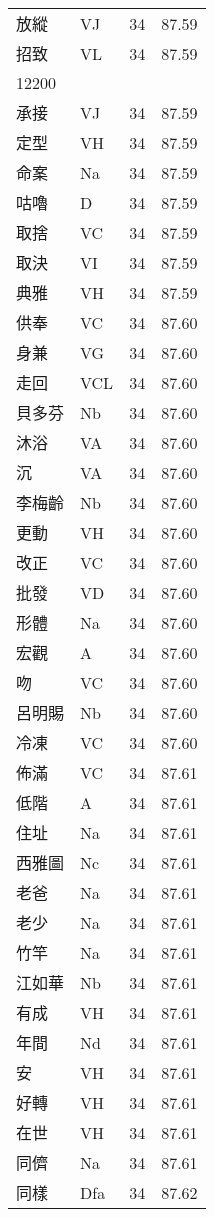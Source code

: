 \documentclass[twocolumn]{book}
\begin{document}
\begin{supertabular}{llrr}
放縱 & VJ & 34 &  87.59\\
招致 & VL & 34 &  87.59\\
12200\\
承接 & VJ & 34 &  87.59\\
定型 & VH & 34 &  87.59\\
命案 & Na & 34 &  87.59\\
咕嚕 & D & 34 &  87.59\\
取捨 & VC & 34 &  87.59\\
取決 & VI & 34 &  87.59\\
典雅 & VH & 34 &  87.59\\
供奉 & VC & 34 &  87.60\\
身兼 & VG & 34 &  87.60\\
走回 & VCL & 34 &  87.60\\
貝多芬 & Nb & 34 &  87.60\\
沐浴 & VA & 34 &  87.60\\
沉 & VA & 34 &  87.60\\
李梅齡 & Nb & 34 &  87.60\\
更動 & VH & 34 &  87.60\\
改正 & VC & 34 &  87.60\\
批發 & VD & 34 &  87.60\\
形體 & Na & 34 &  87.60\\
宏觀 & A & 34 &  87.60\\
吻 & VC & 34 &  87.60\\
呂明賜 & Nb & 34 &  87.60\\
冷凍 & VC & 34 &  87.60\\
佈滿 & VC & 34 &  87.61\\
低階 & A & 34 &  87.61\\
住址 & Na & 34 &  87.61\\
西雅圖 & Nc & 34 &  87.61\\
老爸 & Na & 34 &  87.61\\
老少 & Na & 34 &  87.61\\
竹竿 & Na & 34 &  87.61\\
江如華 & Nb & 34 &  87.61\\
有成 & VH & 34 &  87.61\\
年間 & Nd & 34 &  87.61\\
安 & VH & 34 &  87.61\\
好轉 & VH & 34 &  87.61\\
在世 & VH & 34 &  87.61\\
同儕 & Na & 34 &  87.61\\
同樣 & Dfa & 34 &  87.62\\

\end{supertabular}
\end{document}
